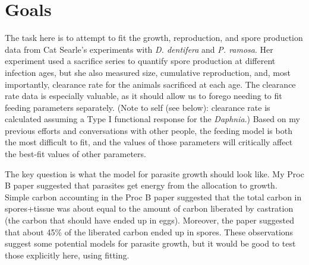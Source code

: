 \documentclass[11pt,reqno,final,pdftex]{amsart}\usepackage[]{graphicx}\usepackage[]{color}
\theoremstyle{plain}
\numberwithin{equation}{part}
\begin{document}
\section*{Goals}
The task here is to attempt to fit the growth, reproduction, and spore production data from Cat Searle's experiments with \emph{D. dentifera} and \emph{P. ramosa}.
Her experiment used a sacrifice series to quantify spore production at different infection ages, but she also measured size, cumulative reproduction, and, most importantly, clearance rate for the animals sacrificed at each age.
The clearance rate data is especially valuable, as it should allow us to forego needing to fit feeding parameters separately.
(Note to self (see below): clearance rate is calculated assuming a Type I functional response for the \emph{Daphnia}.)
Based on my previous efforts and conversations with other people, the feeding model is both the most difficult to fit, and the values of those parameters will critically affect the best-fit values of other parameters.

The key question is what the model for parasite growth should look like.
My Proc B paper suggested that parasites get energy from the allocation to growth.
Simple carbon accounting in the Proc B paper suggested that the total carbon in spores+tissue was about equal to the amount of carbon liberated by castration (the carbon that should have ended up in eggs).
Moreover, the paper suggested that about 45\% of the liberated carbon ended up in spores.
These observations suggest some potential models for parasite growth, but it would be good to test those explicitly here, using fitting.
\end{document}

